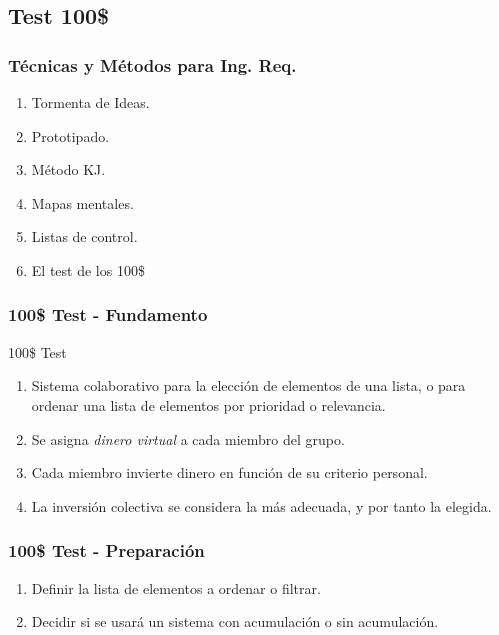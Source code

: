 ﻿\documentclass[handout,a4paper,slidestop,xcolor=pst,dvips,blue]{beamer}
\begin{document}
\subsection{Test 100\$}

\begin{frame}[c]
    \frametitle{Técnicas y Métodos para Ing. Req.}
    \begin{enumerate}
         \item Tormenta de Ideas.
         \item Prototipado.
         \item Método KJ.
         \item Mapas mentales.
         \item Listas de control.
         \item \alert{El test de los 100\$}
    \end{enumerate}
\end{frame}

\begin{frame}[t]
    \frametitle{100\$ Test - Fundamento}
    \begin{block}{100\$ Test}
        \begin{enumerate}
            \item<1-> Sistema colaborativo para la elección de elementos de una lista, o para ordenar una lista de elementos por prioridad o relevancia.
            \item<2-> Se asigna \emph{dinero virtual} a cada miembro del grupo.
            \item<3-> Cada miembro invierte dinero en función de su criterio personal.
            \item<4-> La inversión colectiva se considera la más adecuada, y por tanto la elegida.
        \end{enumerate}
    \end{block}
\end{frame}

\begin{frame}[c]
    \frametitle{100\$ Test - Preparación}
    \begin{enumerate}[<+->]
        \item Definir la lista de elementos a ordenar o filtrar.
        \item Decidir si se usará un sistema con acumulación o sin acumulación.
    \end{enumerate}
\end{frame}
\end{document}
